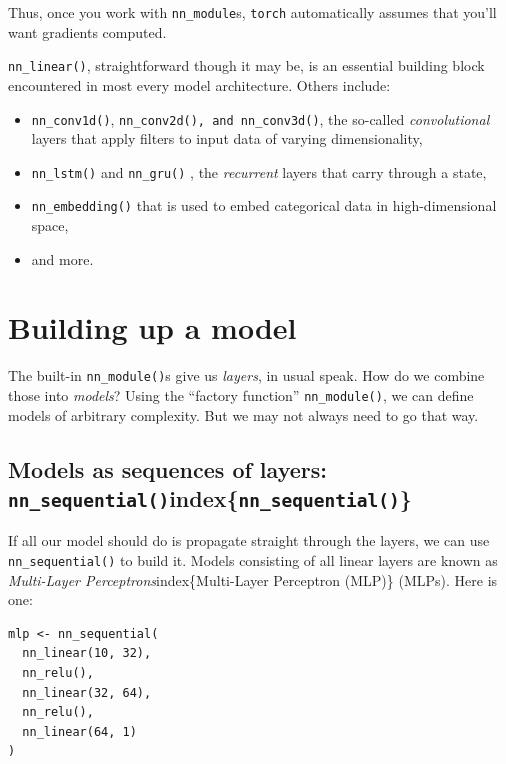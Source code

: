 \documentclass[
  letterpaper,
]{krantz}
\begin{document}
Thus, once you work with \texttt{nn\_module}s, \texttt{torch}
automatically assumes that you'll want gradients computed.

\texttt{nn\_linear()}, straightforward though it may be, is an essential
building block encountered in most every model architecture. Others
include:

\begin{itemize}
\item
  \texttt{nn\_conv1d()}, \texttt{nn\_conv2d(),\ and\ nn\_conv3d()}, the
  so-called \emph{convolutional} layers that apply filters to input data
  of varying dimensionality,
\item
  \texttt{nn\_lstm()} and \texttt{nn\_gru()} , the \emph{recurrent}
  layers that carry through a state,
\item
  \texttt{nn\_embedding()} that is used to embed categorical data in
  high-dimensional space,
\item
  and more.
\end{itemize}

\hypertarget{building-up-a-model}{%
\section{Building up a model}\label{building-up-a-model}}

The built-in \texttt{nn\_module()}s give us \emph{layers}, in usual
speak. How do we combine those into \emph{models}? Using the ``factory
function'' \texttt{nn\_module()}, we can define models of arbitrary
complexity. But we may not always need to go that way.

\hypertarget{models-as-sequences-of-layers-nn_sequentialindexnn_sequential}{%
\subsection{\texorpdfstring{Models as sequences of layers:
\texttt{nn\_sequential()}index\{\texttt{nn\_sequential()}\}}{Models as sequences of layers: nn\_sequential()index\{nn\_sequential()\}}}\label{models-as-sequences-of-layers-nn_sequentialindexnn_sequential}}

If all our model should do is propagate straight through the layers, we
can use \texttt{nn\_sequential()} to build it. Models consisting of all
linear layers are known as \emph{Multi-Layer
Perceptrons}index\{Multi-Layer Perceptron (MLP)\} (MLPs). Here is one:

\begin{verbatim}
mlp <- nn_sequential(
  nn_linear(10, 32),
  nn_relu(),
  nn_linear(32, 64),
  nn_relu(),
  nn_linear(64, 1)
)
\end{verbatim}
\end{document}
